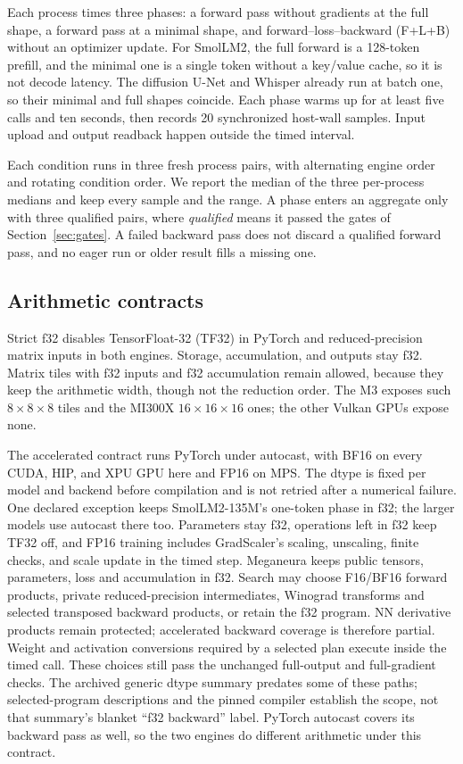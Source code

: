 \documentclass[conference]{IEEEtran}
\newcommand{\system}{Meganeura}
\begin{document}
Each process times three phases: a forward pass without gradients at the
full shape, a forward pass at a minimal shape, and forward--loss--backward
(F+L+B) without an optimizer update. For SmolLM2, the full forward is a
128-token prefill, and the minimal one is a single token without a key/value
cache, so it is not decode latency. The diffusion U-Net and Whisper already
run at batch one, so their minimal and full shapes coincide. Each phase warms
up for at least five calls and ten seconds, then records 20 synchronized
host-wall samples. Input upload and output readback happen outside the timed
interval.

Each condition runs in three fresh process pairs, with alternating engine
order and rotating condition order. We report the median of the three
per-process medians and keep every sample and the range. A phase enters an
aggregate only with three qualified pairs, where \emph{qualified} means it
passed the gates of Section~\ref{sec:gates}. A failed backward pass does not
discard a qualified forward pass, and no eager run or older result fills a
missing one.

\subsection{Arithmetic contracts}
\label{sec:contracts}

Strict f32 disables TensorFloat-32 (TF32) in PyTorch and reduced-precision
matrix inputs in both engines. Storage, accumulation, and outputs stay f32.
Matrix tiles with f32 inputs and f32 accumulation remain allowed, because
they keep the arithmetic width, though not the reduction order. The M3
exposes such $8\times8\times8$ tiles and the MI300X $16\times16\times16$
ones; the other Vulkan GPUs expose none.

The accelerated contract runs PyTorch under autocast, with BF16 on every
CUDA, HIP, and XPU GPU here and FP16 on MPS. The dtype is fixed per model and
backend before compilation and is not retried after a numerical failure.
One declared exception keeps SmolLM2-135M's one-token phase in f32; the
larger models use autocast there too. Parameters stay f32, operations left in
f32 keep TF32 off, and FP16 training includes GradScaler's scaling,
unscaling, finite checks, and scale update in the timed step. \system{}
keeps public tensors, parameters, loss and accumulation in f32. Search may
choose F16/BF16 forward products, private reduced-precision intermediates,
Winograd transforms and selected transposed backward products, or retain the
f32 program. NN derivative products remain protected; accelerated backward
coverage is therefore partial. Weight and activation conversions required by
a selected plan execute inside the timed call. These choices still pass the
unchanged full-output and full-gradient checks. The archived generic dtype
summary predates some of these paths; selected-program descriptions and the
pinned compiler establish the scope, not that summary's blanket ``f32
backward'' label. PyTorch autocast covers its backward pass as well, so the
two engines do different arithmetic under this contract.
\end{document}
